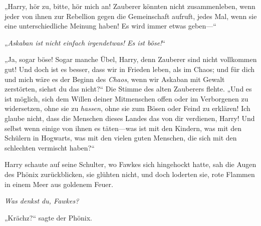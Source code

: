 „Harry, hör zu, bitte, hör mich an! Zauberer könnten nicht zusammenleben, wenn jeder von ihnen zur Rebellion gegen die Gemeinschaft aufruft, jedes Mal, wenn sie eine unterschiedliche Meinung haben! Es wird immer etwas geben—“

„\emph{Askaban ist nicht einfach irgendetwas! Es ist böse!}“

„Ja, sogar böse! Sogar manche Übel, Harry, denn Zauberer sind nicht vollkommen gut! Und doch ist es besser, dass wir in Frieden leben, als im Chaos; und für dich und mich wäre es der Beginn des \emph{Chaos}, wenn wir Askaban mit Gewalt zerstörten, siehst du das nicht?“ Die Stimme des alten Zauberers flehte.
„Und es ist möglich, sich dem Willen deiner Mitmenschen offen oder im Verborgenen zu widersetzen, ohne sie zu \emph{hassen}, ohne sie zum Bösen oder Feind zu erklären! Ich glaube nicht, dass die Menschen dieses Landes das von dir verdienen, Harry! Und selbst wenn einige von ihnen es täten—was ist mit den Kindern, was mit den Schülern in Hogwarts, was mit den vielen guten Menschen, die sich mit den schlechten vermischt haben?“

Harry schaute auf seine Schulter, wo Fawkes sich hingehockt hatte, sah die Augen des Phönix zurückblicken, sie glühten nicht, und doch loderten sie, rote Flammen in einem Meer aus goldenem Feuer.

\emph{Was denkst du, Fawkes?}

„Krächz?“ sagte der Phönix.

